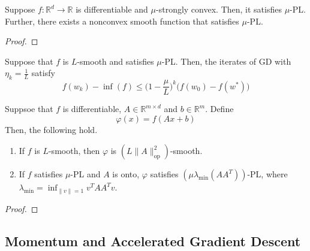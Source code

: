 	\begin{lemma}
		Suppose $f: \mathbb{R}^d \to \mathbb{R}$ is differentiable and $\mu$-strongly convex. Then, it satisfies $\mu$-PL. Further, there exists a nonconvex smooth function that satisfies $\mu$-PL. 
	\end{lemma}
	\begin{proof}
	  
	\end{proof}

	\begin{theorem}
		Suppose that $f$ is $L$-smooth and satisfies $\mu$-PL. Then, the iterates of GD with $\eta_k = \frac{1}{L}$ satisfy 
		\begin{equation}
			f(w_k) - \inf(f) \leq \bigg( 1 - \frac{\mu}{L} \bigg)^k \big( f(w_0) - f(w^\ast) \big) 
		\end{equation}
	\end{theorem}

	\begin{theorem}
		Suppsoe that $f$ is differentiable, $A \in \mathbb{R}^{m \times d}$ and $b \in \mathbb{R}^m$. Define 
		\begin{equation}
		  \varphi(x) = f(Ax + b)
		\end{equation}
		Then, the following hold. 
		\begin{enumerate}
			\item If $f$ is $L$-smooth, then $\varphi$ is $(L\|A\|^2_{\mathrm{op}})$-smooth. 
			\item If $f$ satisfies $\mu$-PL and $A$ is onto, $\varphi$ satisfies $(\mu \lambda_{\mathrm{min}} (AA^T))$-PL, where $\lambda_{\mathrm{min}}  = \inf_{\|v\| = 1} v^T A A^T v$. 
		\end{enumerate}
	\end{theorem}
	\begin{proof}
	  
	\end{proof}

\subsection{Momentum and Accelerated Gradient Descent}

